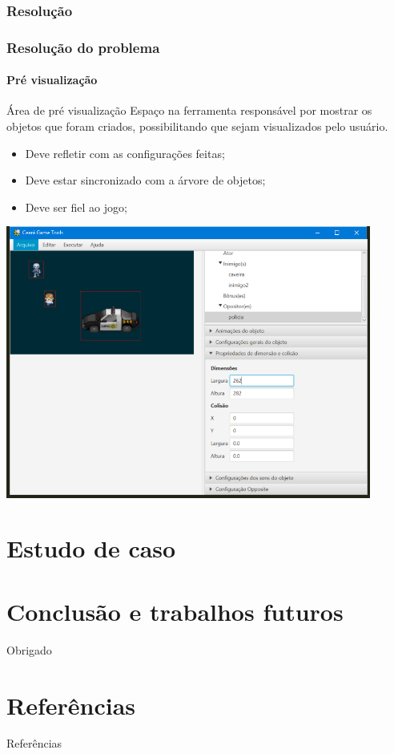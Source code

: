 \documentclass{beamer}
\begin{document}
   \subsubsection{Resolução}
   \begin{frame}
      \frametitle{Resolução do problema}
      \framesubtitle{Pré visualização}

      \begin{block}{Área de pré visualização}
         Espaço na ferramenta responsável por mostrar os objetos que foram criados, possibilitando que sejam visualizados pelo usuário.
      \end{block}

      \begin{itemize}
         \item Deve refletir com as configurações feitas;
         \item Deve estar sincronizado com a árvore de objetos;
         \item Deve ser fiel ao jogo;
      \end{itemize}

   \end{frame}

   \begin{frame}
      \begin{center}
         \includegraphics[width=0.9\textwidth]{images/preview2.png}
      \end{center}
   \end{frame}

   \section{Estudo de caso}
   \begin{frame}
   \end{frame}

   \section{Conclusão e trabalhos futuros}
   \begin{frame}
      \begin{center}
         Obrigado
      \end{center}
   \end{frame}

   \section{Referências}
   \begin{frame}[allowframebreaks]{Referências}
   
   \end{frame}
\end{document}
